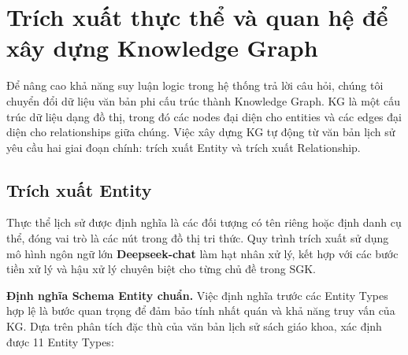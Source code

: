 \section{Trích xuất thực thể và quan hệ để xây dựng Knowledge Graph}
Để nâng cao khả năng suy luận logic trong hệ thống trả lời câu hỏi, chúng tôi chuyển đổi dữ liệu văn bản phi cấu trúc thành Knowledge Graph. KG là một cấu trúc dữ liệu dạng đồ thị, trong đó các nodes đại diện cho entities và các edges đại diện cho relationships giữa chúng. Việc xây dựng KG tự động từ văn bản lịch sử yêu cầu hai giai đoạn chính: trích xuất Entity và trích xuất Relationship.

\subsection{Trích xuất Entity}

Thực thể lịch sử được định nghĩa là các đối tượng có tên riêng hoặc định danh cụ thể, đóng vai trò là các nút trong đồ thị tri thức. Quy trình trích xuất sử dụng mô hình ngôn ngữ lớn \textbf{Deepseek-chat} làm hạt nhân xử lý, kết hợp với các bước tiền xử lý và hậu xử lý chuyên biệt cho từng chủ đề trong  SGK.

\vspace{0.5em}
\noindent\textbf{Định nghĩa Schema Entity chuẩn.}
Việc định nghĩa trước các Entity Types hợp lệ là bước quan trọng để đảm bảo tính nhất quán và khả năng truy vấn của KG. Dựa trên phân tích đặc thù của văn bản lịch sử sách giáo khoa, xác định được 11 Entity Types:


